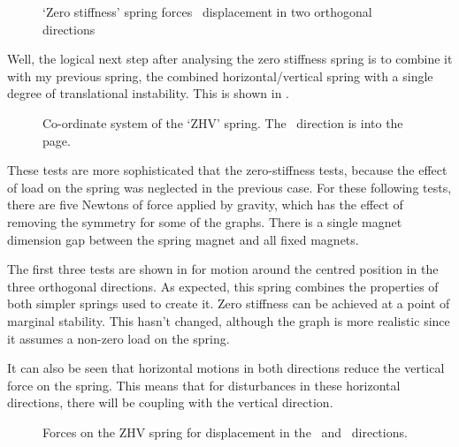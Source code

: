 \documentclass[11pt,a4paper]{memoir}
\begin{document}
\begin{figure}
  \centering
  \caption{`Zero stiffness' spring forces \vs\ displacement in two orthogonal directions}
\end{figure}



Well, the logical next step after analysing the zero stiffness spring
is to combine it with my previous spring, the combined
horizontal/vertical spring with a single degree of translational
instability. This is shown in .

\begin{figure}
   \centering
   \caption{Co-ordinate system of the `ZHV' spring. The \y\ direction is into the page.}
\end{figure}

These tests are more sophisticated that the zero-stiffness tests,
because the effect of load on the spring was neglected in the previous
case. For these following tests, there are five Newtons of force
applied by gravity, which has the effect of removing the symmetry for
some of the graphs. There is a single magnet dimension gap between the
spring magnet and all fixed magnets.

The first three tests are shown in
 for motion
around the centred position in the three orthogonal directions. As
expected, this spring combines the properties of both simpler springs
used to create it. Zero stiffness can be achieved at a point of
marginal stability. This hasn't changed, although the graph is more
realistic since it assumes a non-zero load on the spring.

It can also be seen that horizontal motions in both directions reduce
the vertical force on the spring. This means that for disturbances in
these horizontal directions, there will be coupling with the vertical
direction.

\begin{figure}
   \begin{wide}
   \end{wide}
   \caption{Forces on the ZHV spring for displacement in the \x\ and \y\ directions.}
\end{figure}
\end{document}
